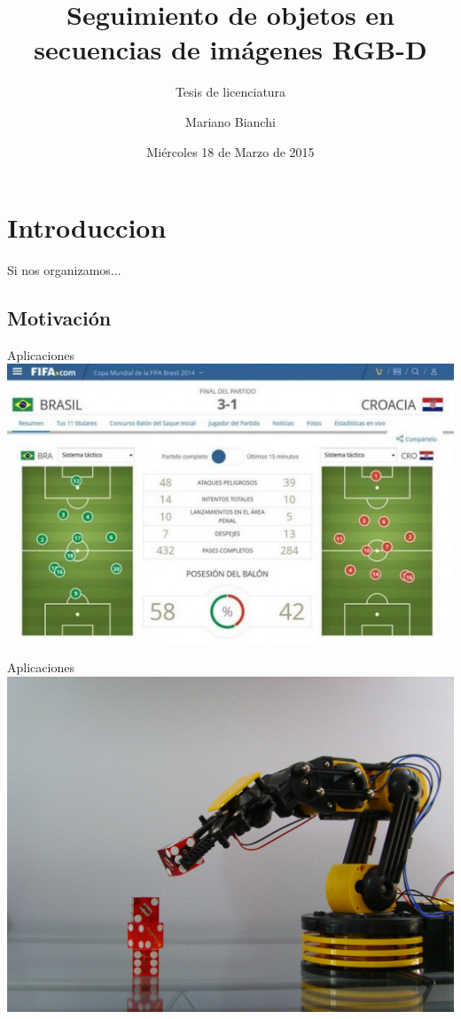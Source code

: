 \documentclass[]{beamer}
\title{Seguimiento de objetos en secuencias de imágenes RGB-D}
\subtitle{Tesis de licenciatura}
\institute{Facultad de Ciencias Exactas y Naturales}
\date[18/03/15]{Miércoles 18 de Marzo de 2015}
\author[Mariano Bianchi]{Mariano Bianchi}
\begin{document}
\maketitle


\section{Introduccion}
\begin{frame}[t]{Si nos organizamos...}
    \tableofcontents
\end{frame}

\subsection{Motivación}
\begin{frame}{Aplicaciones} %
    \includegraphics[scale=1]{img/estadistica.jpg}
\end{frame}

\begin{frame}{Aplicaciones}
    \includegraphics[scale=1]{img/robot.jpg}
\end{frame}
\end{document}
